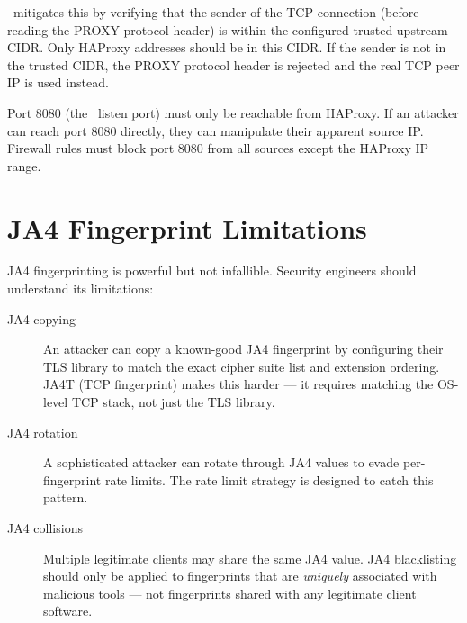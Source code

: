 \ja\ mitigates this by verifying that the sender of the TCP connection (before reading
the PROXY protocol header) is within the configured trusted upstream CIDR. Only
HAProxy addresses should be in this CIDR. If the sender is not in the trusted CIDR,
the PROXY protocol header is rejected and the real TCP peer IP is used instead.

\begin{warningbox}
Port 8080 (the \ja\ listen port) must only be reachable from HAProxy. If an attacker
can reach port 8080 directly, they can manipulate their apparent source IP. Firewall
rules must block port 8080 from all sources except the HAProxy IP range.
\end{warningbox}

\section{JA4 Fingerprint Limitations}

JA4 fingerprinting is powerful but not infallible. Security engineers should
understand its limitations:

\begin{description}
  \item[JA4 copying] An attacker can copy a known-good JA4 fingerprint by configuring
    their TLS library to match the exact cipher suite list and extension ordering.
    JA4T (TCP fingerprint) makes this harder — it requires matching the OS-level TCP
    stack, not just the TLS library.
  \item[JA4 rotation] A sophisticated attacker can rotate through JA4 values to evade
    per-fingerprint rate limits. The  rate limit strategy is
    designed to catch this pattern.
  \item[JA4 collisions] Multiple legitimate clients may share the same JA4 value.
    JA4 blacklisting should only be applied to fingerprints that are \textit{uniquely}
    associated with malicious tools — not fingerprints shared with any legitimate client
    software.
\end{description}
